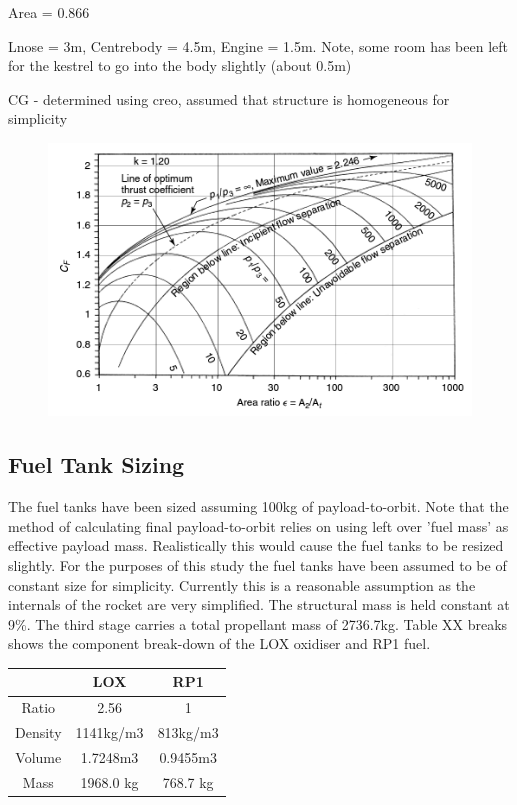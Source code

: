 	
	Area = 0.866
	
	Lnose = 3m, Centrebody = 4.5m, Engine = 1.5m. Note, some room has been left for the kestrel to go into the body slightly (about 0.5m)
	
	CG - determined using creo, assumed that structure is homogeneous for simplicity
	
	
	\begin{figure}
\centering
\includegraphics[width=0.7\linewidth]{"figures/3_vehicle_design/Thrust Coefficient - Arat"}
\caption{\cite{RPE}}
\label{fig:ThrustCoefficient-Arat}
\end{figure}

		
		\subsection{Fuel Tank Sizing}
		The fuel tanks have been sized assuming 100kg of payload-to-orbit. Note that the method of calculating final payload-to-orbit relies on using left over 'fuel mass' as effective payload mass. Realistically this would cause the fuel tanks to be resized slightly. For the purposes of this study the fuel tanks have been assumed to be of constant size for simplicity. Currently this is a reasonable assumption as the internals of the rocket are very simplified. The structural mass is held constant at 9\%. The third stage carries a total propellant mass of 2736.7kg. Table XX breaks shows the component break-down of the LOX oxidiser and RP1 fuel.  
		
\begin{tabular}{|c|c|c|}
	\hline  & \textbf{LOX} & \textbf{RP1} \\ 
	\hline Ratio & 2.56 & 1 \\ 
	\hline Density & 1141kg/m3 & 813kg/m3 \cite{Magee}\\ 
	\hline Volume & 1.7248m3 & 0.9455m3 \\ 
	\hline Mass & 1968.0 kg & 768.7 kg \\ 
	\hline 
\end{tabular} 
		
